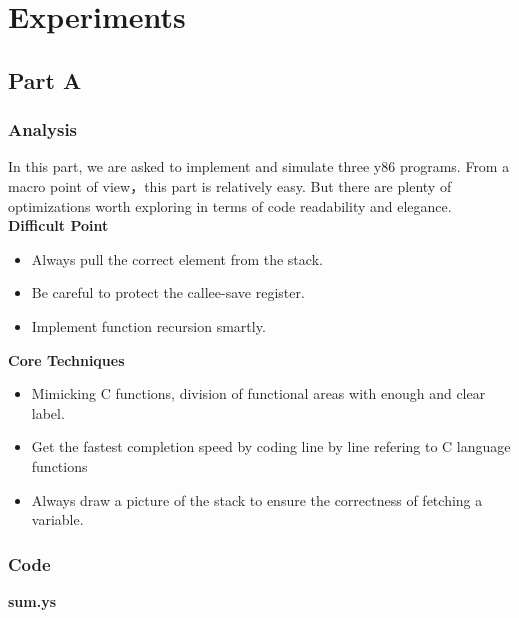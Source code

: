 \documentclass{article}
\begin{document}
\section{Experiments}
\subsection{Part A}
\subsubsection{Analysis}
In this part, we are asked to implement and simulate three y86 programs. 
From a macro point of view，this part is relatively easy. 
But there are plenty of optimizations worth exploring in terms of code readability and elegance.\\
\textbf{Difficult Point} 
\begin{itemize}
        \item Always pull the correct element from the stack.
        \item Be careful to protect the callee-save register.
        \item Implement function recursion smartly.
\end{itemize}
\textbf{Core Techniques}
\begin{itemize}
        \item Mimicking C functions, division of functional areas with enough and clear label.
        \item Get the fastest completion speed by coding line by line refering to C language functions
        \item Always draw a picture of the stack to ensure the correctness of fetching a variable.
\end{itemize}

\subsubsection{Code}
\begin{center}
        \textbf{sum.ys}
\end{center}
\end{document}
